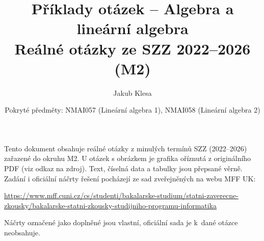 \documentclass[11pt,a4paper]{article}
\title{Příklady otázek -- Algebra a lineární algebra\\[0.3em]\large Reálné otázky ze SZZ 2022--2026 (M2)}
\author{Jakub Klesa}
\date{Pokryté předměty: NMAI057 (Lineární algebra 1), NMAI058 (Lineární algebra 2)}
\begin{document}
\maketitle
\tableofcontents
\bigskip

\begin{poznamka}
Tento dokument obsahuje reálné otázky z minulých termínů SZZ (2022--2026) zařazené do
okruhu M2. U otázek s obrázkem je grafika oříznutá z originálního PDF (viz odkaz na
zdroj). Text, číselná data a tabulky jsou přepsané věrně.
Zadání i oficiální náčrty řešení pocházejí ze sad zveřejněných na webu MFF UK:\par
{\raggedright\url{https://www.mff.cuni.cz/cs/studenti/bakalarske-studium/statni-zaverecne-zkousky/bakalarske-statni-zkousky-studijniho-programu-informatika}\par}
Náčrty označené jako doplněné jsou vlastní, oficiální sada je k~dané otázce neobsahuje.
\end{poznamka}
\bigskip









\end{document}
